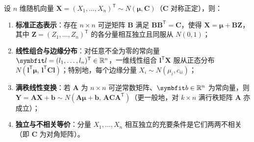 \begin{theorem}[$n$ 维正态分布的基本性质]
\label{thm:multivariate-normal-properties}
设 $n$ 维随机向量 $\bm{X}=(X_1,\ldots,X_n)^{\mathsf{T}}\sim N(\bm{\mu},\bm{C})$（$\bm{C}$ 对称正定），则：
\begin{enumerate}
  \item \textbf{标准正态表示}：存在 $n\times n$ 可逆矩阵 $\bm{B}$ 满足 $\bm{B}\bm{B}^{\mathsf{T}}=\bm{C}$，使得 $\bm{X}=\bm{\mu}+\bm{B}\bm{Z}$，其中 $\bm{Z}=(Z_1,\ldots,Z_n)^{\mathsf{T}}$ 的各分量相互独立且同服从 $N(0,1)$；
  \item \textbf{线性组合与边缘分布}：对任意不全为零的常向量 $\bm{l}=(l_1,\ldots,l_n)^{\mathsf{T}}\in\R^n$，一维线性组合 $\bm{l}^{\mathsf{T}}\bm{X}$ 服从正态分布 $N(\bm{l}^{\mathsf{T}}\bm{\mu},\,\bm{l}^{\mathsf{T}}\bm{C}\bm{l})$；特别地，每个边缘分量 $X_i\sim N(\mu_i,c_{ii})$；
  \item \textbf{满秩线性变换}：若 $\bm{A}$ 为 $n\times n$ 可逆常数矩阵、$\bm{b}\in\R^n$ 为常向量，则 $\bm{Y}=\bm{A}\bm{X}+\bm{b}\sim N(\bm{A}\bm{\mu}+\bm{b},\,\bm{A}\bm{C}\bm{A}^{\mathsf{T}})$（更一般地，对 $k\times n$ 满行秩矩阵 $\bm{A}$ 亦成立）；
  \item \textbf{独立与不相关等价}：分量 $X_1,\ldots,X_n$ 相互独立的充要条件是它们两两不相关（即 $\bm{C}$ 为对角矩阵）。
\end{enumerate}
\end{theorem}
